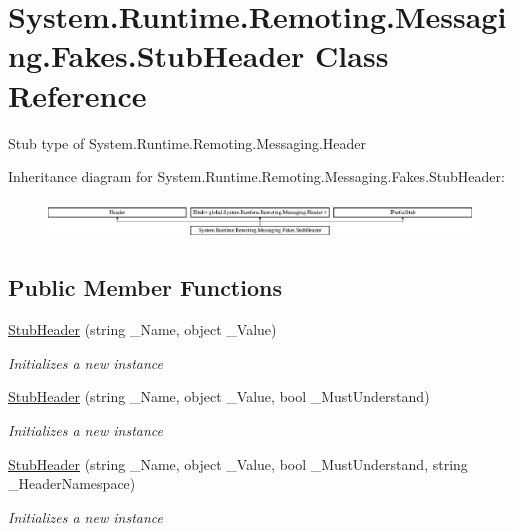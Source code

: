 \hypertarget{class_system_1_1_runtime_1_1_remoting_1_1_messaging_1_1_fakes_1_1_stub_header}{\section{System.\-Runtime.\-Remoting.\-Messaging.\-Fakes.\-Stub\-Header Class Reference}
\label{class_system_1_1_runtime_1_1_remoting_1_1_messaging_1_1_fakes_1_1_stub_header}
}


Stub type of System.\-Runtime.\-Remoting.\-Messaging.\-Header 


Inheritance diagram for System.\-Runtime.\-Remoting.\-Messaging.\-Fakes.\-Stub\-Header\-:\begin{figure}[H]
\begin{center}
\leavevmode
\includegraphics[height=1.025641cm]{class_system_1_1_runtime_1_1_remoting_1_1_messaging_1_1_fakes_1_1_stub_header}
\end{center}
\end{figure}
\subsection*{Public Member Functions}
\begin{DoxyCompactItemize}
\item 
\hyperlink{class_system_1_1_runtime_1_1_remoting_1_1_messaging_1_1_fakes_1_1_stub_header_ad28e4d2c2ef09ef65fc1da1086489a20}{Stub\-Header} (string \-\_\-\-Name, object \-\_\-\-Value)
\begin{DoxyCompactList}\small\item\em Initializes a new instance\end{DoxyCompactList}\item 
\hyperlink{class_system_1_1_runtime_1_1_remoting_1_1_messaging_1_1_fakes_1_1_stub_header_a1141996f1484e7dcad81a4f8ce828960}{Stub\-Header} (string \-\_\-\-Name, object \-\_\-\-Value, bool \-\_\-\-Must\-Understand)
\begin{DoxyCompactList}\small\item\em Initializes a new instance\end{DoxyCompactList}\item 
\hyperlink{class_system_1_1_runtime_1_1_remoting_1_1_messaging_1_1_fakes_1_1_stub_header_a162450e061009b66e9783393db58cd3f}{Stub\-Header} (string \-\_\-\-Name, object \-\_\-\-Value, bool \-\_\-\-Must\-Understand, string \-\_\-\-Header\-Namespace)
\begin{DoxyCompactList}\small\item\em Initializes a new instance\end{DoxyCompactList}\end{DoxyCompactItemize}
